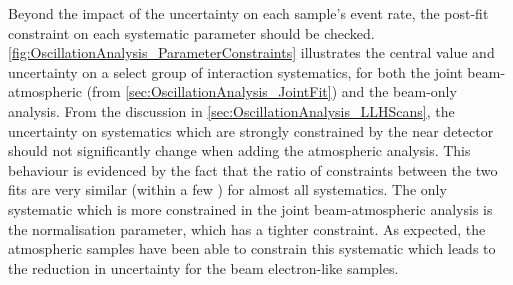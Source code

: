 Beyond the impact of the uncertainty on each sample's event rate, the post-fit constraint on each systematic parameter should be checked. \autoref{fig:OscillationAnalysis_ParameterConstraints} illustrates the central value and uncertainty on a select group of interaction systematics, for both the joint beam-atmospheric (from \autoref{sec:OscillationAnalysis_JointFit}) and the beam-only analysis. From the discussion in \autoref{sec:OscillationAnalysis_LLHScans}, the uncertainty on systematics which are strongly constrained by the near detector should not significantly change when adding the atmospheric analysis. This behaviour is evidenced by the fact that the ratio of constraints between the two fits are very similar (within a few \quickmath{\%}) for almost all systematics. The only systematic which is more constrained in the joint beam-atmospheric analysis is the  normalisation parameter, which has a  tighter constraint. As expected, the atmospheric samples have been able to constrain this systematic which leads to the reduction in uncertainty for the beam electron-like samples.

